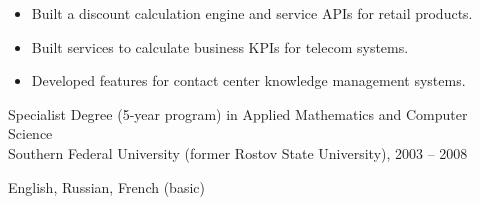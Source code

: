 \begin{itemize}[leftmargin=1.3em, itemsep=0.2em]
  \item Built a discount calculation engine and service APIs for retail products.
  \item Built services to calculate business KPIs for telecom systems.
  \item Developed features for contact center knowledge management systems.
\end{itemize}


Specialist Degree (5-year program) in Applied Mathematics and Computer Science\\
Southern Federal University (former Rostov State University), 2003 -- 2008

English, Russian, French (basic)
